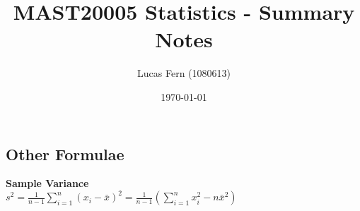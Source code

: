 \documentclass[titlepage,twocolumn]{article}
\title{MAST20005 Statistics - Summary Notes}
\date{\today}
\author{Lucas Fern (1080613)}
\begin{document}
\subsection*{Other Formulae}
\textbf{Sample Variance}\\
$s^2 = \frac{1}{n-1} \sum_{i=1}^{n} (x_{i}-\bar{x})^2 = \frac{1}{n-1} (\sum_{i=1}^{n} x_{i}^2 -n \bar{x}^2)$
\end{document}
